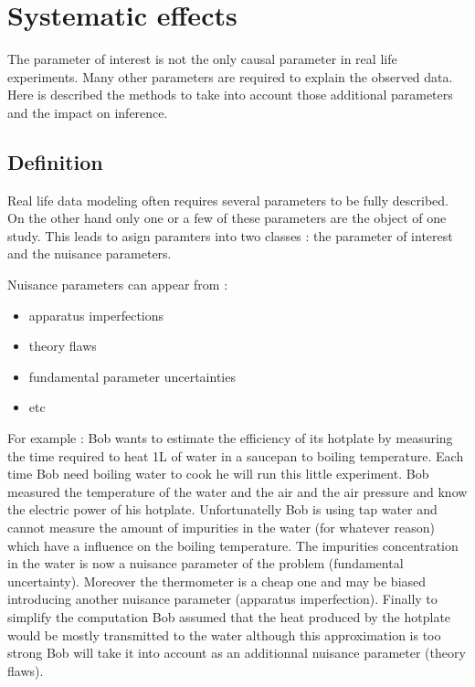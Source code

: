 \section{Systematic effects} %
\label{sec:systematic_effects}


The parameter of interest is not the only causal parameter in real life experiments.
Many other parameters are required to explain the observed data.
Here is described the methods to take into account those additional parameters and the impact on inference. 



\subsection{Definition} %
\label{sub:definition}

Real life data modeling often requires several parameters to be fully described.
On the other hand only one or a few of these parameters are the object of one study.
This leads to asign paramters into two classes : the parameter of interest and the nuisance parameters.

Nuisance parameters can appear from :
\begin{itemize}
	\item apparatus imperfections
	\item theory flaws
	\item fundamental parameter uncertainties
	\item etc
\end{itemize}

For example : Bob wants to estimate the efficiency of its hotplate by measuring the time required to heat 1L of water in a saucepan to boiling temperature.
Each time Bob need boiling water to cook he will run this little experiment.
Bob measured the temperature of the water and the air and the air pressure and know the electric power of his hotplate.
Unfortunatelly Bob is using tap water and cannot measure the amount of impurities in the water (for whatever reason) which have a influence on the boiling temperature.
The impurities concentration in the water is now a nuisance parameter of the problem (fundamental uncertainty).
Moreover the thermometer is a cheap one and may be biased introducing another nuisance parameter (apparatus imperfection).
Finally to simplify the computation Bob assumed that the heat produced by the hotplate would be mostly transmitted to the water although this approximation is too strong Bob will take it into account as an additionnal nuisance parameter (theory flaws).





